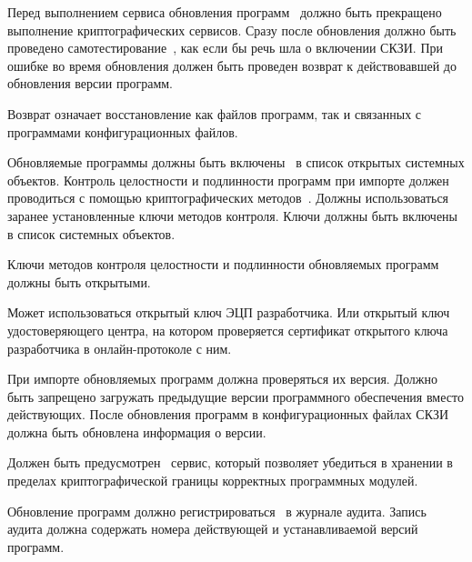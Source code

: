 \label{R.SU.Logic} %
Перед выполнением сервиса обновления программ~ 
должно быть прекращено выполнение криптографических сервисов. 
%
Сразу после обновления должно быть проведено 
самотестирование~, 
как если бы речь шла о включении СКЗИ.
%
При ошибке во время обновления должен быть проведен
возврат к действовавшей до обновления версии программ. 

\begin{note*}
Возврат означает восстановление как файлов программ, так и связанных с 
программами конфигурационных файлов. 
\end{note*}

\label{R.SU.Import} %
Обновляемые программы должны быть включены~ в список
открытых системных объектов. Контроль целостности и подлинности программ при
импорте должен проводиться с помощью криптографических
методов~. Должны использоваться заранее установленные ключи
методов контроля. Ключи должны быть включены~ в список
системных объектов.

\label{R.SU.Sig} %
Ключи методов контроля целостности и подлинности обновляемых программ должны 
быть открытыми. 

\begin{note*}
Может использоваться открытый ключ ЭЦП разработчика. Или открытый ключ
удостоверяющего центра, на котором проверяется сертификат открытого ключа
разработчика в онлайн-протоколе с ним.
\end{note*}

\label{R.SU.Version} %
При импорте обновляемых программ должна проверяться их версия.
Должно быть запрещено загружать предыдущие версии программного обеспечения 
вместо действующих. После обновления программ в конфигурационных файлах СКЗИ
должна быть обновлена информация о версии.

\label{R.SU.PoS} %
Должен быть предусмотрен~ сервис, который позволяет убедиться
в хранении в пределах криптографической границы корректных программных модулей.

\label{R.SU.AU} %
Обновление программ должно регистрироваться~ в журнале
аудита.
%
Запись аудита должна содержать номера действующей и устанавливаемой версий
программ.

